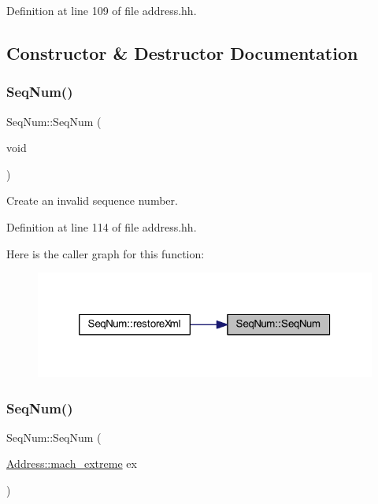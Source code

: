 Definition at line 109 of file address.\+hh.



\subsection{Constructor \& Destructor Documentation}
\mbox{\label{class_seq_num_a9e03f519b494d0279ffc80591e8d66a8}} 
\subsubsection{\texorpdfstring{SeqNum()}{SeqNum()}\hspace{0.1cm}{\footnotesize\ttfamily [1/4]}}
{\footnotesize\ttfamily Seq\+Num\+::\+Seq\+Num (\begin{DoxyParamCaption}\item[{void}]{ }\end{DoxyParamCaption})\hspace{0.3cm}{\ttfamily [inline]}}



Create an invalid sequence number. 



Definition at line 114 of file address.\+hh.

Here is the caller graph for this function\+:
\nopagebreak
\begin{figure}[H]
\begin{center}
\leavevmode
\includegraphics[width=320pt]{class_seq_num_a9e03f519b494d0279ffc80591e8d66a8_icgraph}
\end{center}
\end{figure}
\mbox{\label{class_seq_num_a7f9a1c7e68897a62f716d0b8cc4bbc5c}} 
\subsubsection{\texorpdfstring{SeqNum()}{SeqNum()}\hspace{0.1cm}{\footnotesize\ttfamily [2/4]}}
{\footnotesize\ttfamily Seq\+Num\+::\+Seq\+Num (\begin{DoxyParamCaption}\item[{\mbox{\hyperlink{class_address_ab6dfc48b4779dab420c4ae0bc5aaffd7}{Address\+::mach\+\_\+extreme}}}]{ex }\end{DoxyParamCaption})}




